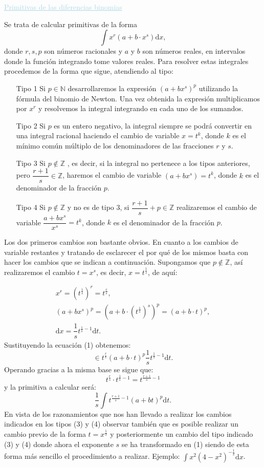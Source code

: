 \textcolor{lightblue}{\underline{Primitivas de las diferencias binomias}}

Se trata de calcular primitivas de la forma \[ \int x^r(a+b\cdot x^s)\mathrm{d}x, \] donde $r,s,p$ son números racionales y $a$ y $b$ son números reales, en intervalos donde la función integrando tome valores reales. Para resolver estas integrales procedemos de la forma que sigue, atendiendo al tipo:
\begin{itemize}
	\item[\color{lightblue}Tipo 1] Si $p\in\mathbb{N}$  desarrollaremos la expresión $(a+bx^s)^p$ utilizando la fórmula del binomio de Newton. Una vez obtenida la expresión multiplicamos por $x^r$ y resolvemos la integral integrando en cada uno de los sumandos.
	\item[\color{lightblue}Tipo 2] Si $p$ es un entero negativo, la integral siempre se podrá convertir en una integral racional haciendo el cambio de variable $x=t^k$, donde $k$ es el mínimo común múltiplo de los denominadores de las fracciones $r$ y $s$.
	\item[\color{lightblue}Tipo 3] Si $p\notin\mathbb{Z}$ , es decir, si la integral no pertenece a los tipos anteriores, pero $\dfrac{r+1}{s}\in\mathbb{Z}$, haremos el cambio de variable $(a+bx^s)=t^k$, donde $k$ es el denominador de la fracción $p$.
	\item[\color{lightblue}Tipo 4] Si $p\notin\mathbb{Z}$ y no es de tipo 3, si $\dfrac{r+1}{s}+p\in\mathbb{Z}$ realizaremos el cambio de variable $\dfrac{a+bx^s}{x^s}=t^k$, donde $k$ es el denominador de la fracción $p$.
\end{itemize}
Los dos primeros cambios son bastante obvios. En cuanto a los cambios de variable restantes y tratando de esclarecer el por qué de los mismos basta con hacer los cambios que se indican a continuación. Supongamos que $p\notin\mathbb{Z}$, así realizaremos el cambio $t=x^s$, es decir, $x=t^{\frac{1}{s}}$, de aquí: 

\begin{gather}
	 x^r=\left(t^{\frac{1}{s}}\right)^r=t^{\frac{r}{s}}, \\ 
	(a+bx^s)^p=\left(a+b\cdot\left(t^{\frac{1}{s}}\right)^s\right)^p=(a+b\cdot t)^p,\\
	\mathrm{d}x=\dfrac{1}{s}t^{\frac{1}{s}-1}\mathrm{d}t.
\end{gather}
Sustituyendo la ecuación (1) obtenemos: \[ \in t^{\frac{r}{s}}(a+b\cdot t)^p\dfrac{1}{s}t^{\frac{1}{s}-1}\mathrm{d}t. \] Operando gracias a la misma base se sigue que: \[ t^{\frac{r}{s}}\cdot t^{\frac{1}{s}-1}=t^{\frac{r+1}{s}-1} \] y la primitiva a calcular será: \[ \dfrac{1}{s}\int t^{\frac{r+1}{s}-1}(a+bt)^p\mathrm{d}t. \]
En vista de los razonamientos que nos han llevado a realizar los cambios indicados en los tipos (3) y (4) observar también que es posible realizar un cambio previo de la forma $t=x^{\frac{1}{s}}$ y posteriormente un cambio del tipo indicado (3) y (4) donde ahora el exponente $s$ se ha transformado en (1) siendo de esta forma más sencillo el procedimiento a realizar. Ejemplo: $\int x^2(4-x^2)^{-\frac{1}{2}}\mathrm{d}x$.

